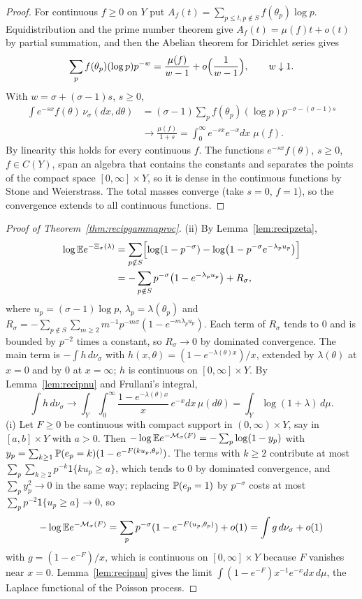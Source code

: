 \begin{proof}
For continuous $f\ge0$ on $Y$ put $A_f(t)=\sum_{p\le t,p\notin S}f(\theta_p)\log p$. Equidistribution and the prime number theorem give $A_f(t)=\mu(f)t+o(t)$ by partial summation, and then the Abelian theorem for Dirichlet series gives
\[
\sum_pf(\theta_p)(\log p)p^{-w}=\frac{\mu(f)}{w-1}+o\Bigl(\frac1{w-1}\Bigr),\qquad w\downarrow1.
\] With $w=\sigma+(\sigma-1)s$, $s\ge0$,
\[
\begin{split}
\int e^{-sx}f(\theta)\,\nu_\sigma(dx,d\theta)&=(\sigma-1)\sum_pf(\theta_p)(\log p)p^{-\sigma-(\sigma-1)s}\\
&\to\frac{\mu(f)}{1+s}=\int_0^\infty e^{-sx}e^{-x}dx\;\mu(f).
\end{split}
\]
By linearity this holds for every continuous $f$. The functions $e^{-sx}f(\theta)$, $s\ge0$, $f\in C(Y)$, span an algebra that contains the constants and separates the points of the compact space $[0,\infty]\times Y$, so it is dense in the continuous functions by Stone and Weierstrass. The total masses converge (take $s=0$, $f=1$), so the convergence extends to all continuous functions.
\end{proof}

\begin{proof}[Proof of Theorem~\ref{thm:recipgammaproc}]
(ii) By Lemma~\ref{lem:recipzeta},
\[
\begin{split}
\log\mathbb{E} e^{-\Xi_\sigma(\lambda)}&=\sum_{p\notin S}\Bigl[\log(1-p^{-\sigma})-\log\bigl(1-p^{-\sigma}e^{-\lambda_pu_p}\bigr)\Bigr]\\
&=-\sum_{p\notin S}p^{-\sigma}\bigl(1-e^{-\lambda_pu_p}\bigr)+R_\sigma ,
\end{split}
\]
where $u_p=(\sigma-1)\log p$, $\lambda_p=\lambda(\theta_p)$ and $R_\sigma=-\sum_{p\notin S}\sum_{m\ge2}m^{-1}p^{-m\sigma}(1-e^{-m\lambda_pu_p})$. Each term of $R_\sigma$ tends to $0$ and is bounded by $p^{-2}$ times a constant, so $R_\sigma\to0$ by dominated convergence. The main term is $-\int h\,d\nu_\sigma$ with $h(x,\theta)=(1-e^{-\lambda(\theta)x})/x$, extended by $\lambda(\theta)$ at $x=0$ and by $0$ at $x=\infty$; $h$ is continuous on $[0,\infty]\times Y$. By Lemma~\ref{lem:recipnu} and Frullani's integral,
\[
\int h\,d\nu_\sigma\to\int_Y\!\int_0^\infty\frac{1-e^{-\lambda(\theta)x}}x\,e^{-x}dx\,\mu(d\theta)=\int_Y\log(1+\lambda)\,d\mu .
\]
(i) Let $F\ge0$ be continuous with compact support in $(0,\infty)\times Y$, say in $[a,b]\times Y$ with $a>0$. Then $-\log\mathbb{E} e^{-\mathcal M_\sigma(F)}=-\sum_p\log(1-y_p)$ with $y_p=\sum_{k\ge1}\mathbb{P}(e_p=k)(1-e^{-F(ku_p,\theta_p)})$. The terms with $k\ge2$ contribute at most $\sum_p\sum_{k\ge2}p^{-k}\mathsf{1}\{ku_p\ge a\}$, which tends to $0$ by dominated convergence, and $\sum_py_p^2\to0$ in the same way; replacing $\mathbb{P}(e_p=1)$ by $p^{-\sigma}$ costs at most $\sum_pp^{-2}\mathsf{1}\{u_p\ge a\}\to0$, so
\[
-\log\mathbb{E} e^{-\mathcal M_\sigma(F)}=\sum_pp^{-\sigma}(1-e^{-F(u_p,\theta_p)})+o(1)=\int g\,d\nu_\sigma+o(1)
\]
with $g=(1-e^{-F})/x$, which is continuous on $[0,\infty]\times Y$ because $F$ vanishes near $x=0$. Lemma~\ref{lem:recipnu} gives the limit $\int(1-e^{-F})x^{-1}e^{-x}dx\,d\mu$, the Laplace functional of the Poisson process.
\end{proof}

